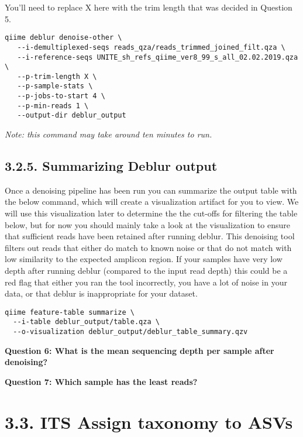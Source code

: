 \documentclass[
]{book}
\begin{document}
You'll need to replace X here with the trim length that was decided in Question 5.

\begin{verbatim}
qiime deblur denoise-other \
   --i-demultiplexed-seqs reads_qza/reads_trimmed_joined_filt.qza \
   --i-reference-seqs UNITE_sh_refs_qiime_ver8_99_s_all_02.02.2019.qza \
   --p-trim-length X \
   --p-sample-stats \
   --p-jobs-to-start 4 \
   --p-min-reads 1 \
   --output-dir deblur_output
\end{verbatim}

\emph{Note: this command may take around ten minutes to run.}

\subsection{3.2.5. Summarizing Deblur output}\label{summarizing-deblur-output-2}

Once a denoising pipeline has been run you can summarize the output table with the below command, which will create a visualization artifact for you to view. We will use this visualization later to determine the the cut-offs for filtering the table below, but for now you should mainly take a look at the visualization to ensure that sufficient reads have been retained after running deblur. This denoising tool filters out reads that either do match to known noise or that do not match with low similarity to the expected amplicon region. If your samples have very low depth after running deblur (compared to the input read depth) this could be a red flag that either you ran the tool incorrectly, you have a lot of noise in your data, or that deblur is inappropriate for your dataset.

\begin{verbatim}
qiime feature-table summarize \
  --i-table deblur_output/table.qza \
  --o-visualization deblur_output/deblur_table_summary.qzv
\end{verbatim}

\textbf{Question 6: What is the mean sequencing depth per sample after denoising?}

\textbf{Question 7: Which sample has the least reads?}

\section{3.3. ITS Assign taxonomy to ASVs}\label{its-assign-taxonomy-to-asvs}
\end{document}
